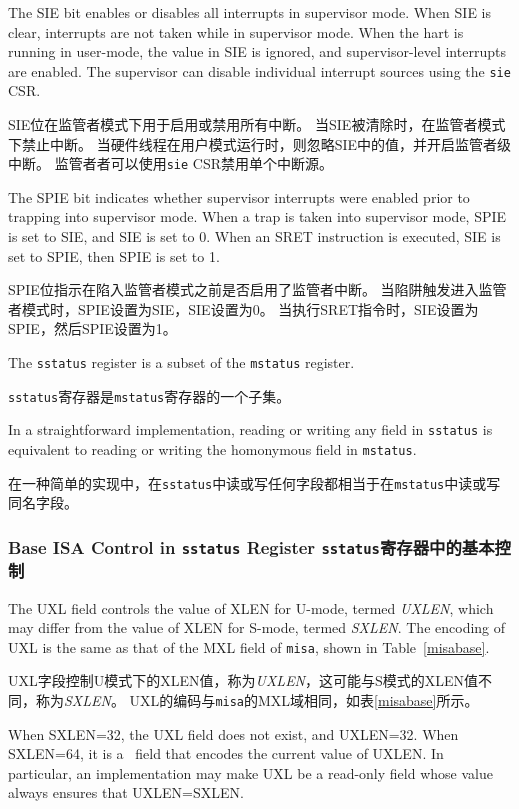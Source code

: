 The SIE bit enables or disables all interrupts in supervisor mode.
When SIE is clear, interrupts are not taken while in supervisor mode.
When the hart is running in user-mode, the value in SIE is ignored, and
supervisor-level interrupts are enabled.  The supervisor can disable
individual interrupt sources using the {\tt sie} CSR.


SIE位在监管者模式下用于启用或禁用所有中断。
当SIE被清除时，在监管者模式下禁止中断。
当硬件线程在用户模式运行时，则忽略SIE中的值，并开启监管者级中断。
监管者者可以使用{\tt sie} CSR禁用单个中断源。

The SPIE bit indicates whether supervisor interrupts were enabled prior to
trapping into supervisor mode.  When a trap is taken into supervisor
mode, SPIE is set to SIE, and SIE is set to 0.  When an SRET instruction is
executed, SIE is set to SPIE, then SPIE is set to 1.

SPIE位指示在陷入监管者模式之前是否启用了监管者中断。
当陷阱触发进入监管者模式时，SPIE设置为SIE，SIE设置为0。
当执行SRET指令时，SIE设置为SPIE，然后SPIE设置为1。

The {\tt sstatus} register is a subset of the {\tt mstatus} register.

{\tt sstatus}寄存器是{\tt mstatus}寄存器的一个子集。

\begin{commentary}

  In a straightforward implementation, reading or writing any field in
  {\tt sstatus} is equivalent to reading or writing the homonymous field
  in {\tt mstatus}.

在一种简单的实现中，在{\tt sstatus}中读或写任何字段都相当于在{\tt mstatus}中读或写同名字段。
\end{commentary}

\subsubsection{Base ISA Control in {\tt sstatus} Register {\tt sstatus}寄存器中的基本控制}

The UXL field controls the value of XLEN for U-mode, termed {\em UXLEN},
which may differ from the value of XLEN for S-mode, termed {\em SXLEN}.  The
encoding of UXL is the same as that of the MXL field of {\tt misa}, shown in
Table~\ref{misabase}.

UXL字段控制U模式下的XLEN值，称为{\em UXLEN}，这可能与S模式的XLEN值不同，称为{\em SXLEN}。
UXL的编码与{\tt misa}的MXL域相同，如表\ref{misabase}所示。

When SXLEN=32, the UXL field does not exist, and UXLEN=32.  When
SXLEN=64, it is a \warl\ field that encodes the current value of UXLEN.
In particular, an implementation may make UXL be a read-only field whose
value always ensures that UXLEN=SXLEN.


